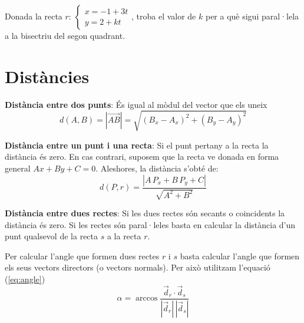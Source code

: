 \begin{mylist}
	\exer Donada la recta $r:\, \left\{ \begin{array}{l}
	x=-1+3t \\
	y=2+kt
	\end{array} \right.$, troba el valor de $k$ per a què sigui paral·lela a la bisectriu del segon quadrant.

\end{mylist}	

	
\pagebreak
\section{Distàncies}
\begin{theorybox}
	\textbf{Distància entre dos punts}: És igual al mòdul del vector que els uneix 
	\begin{equation*}
		d(A,B)=|\overrightarrow{AB}|=\sqrt{(B_x-A_x)^2 + (B_y-A_y)^2}
	\end{equation*}
	
	\textbf{Distància entre un punt i una recta}: Si el punt pertany a la recta la distància és zero. En cas contrari, suposem que la recta ve donada en forma general $Ax+By+C=0$. Aleshores, la distància s'obté de:
	\begin{equation*}
	d(P,r)=\frac{|A\,P_x+B\,P_y+C|}{\sqrt{A^2+B^2}} 
	\end{equation*}
	
\textbf{Distància entre dues rectes}: Si les dues rectes són secants o coincidents la distància és zero. Si les rectes són paral·leles basta en calcular la distància d'un punt qualsevol de la recta $s$ a la recta $r$.
\end{theorybox}

 \begin{theorybox}
 	Per calcular l'angle que formen dues rectes $r$ i $s$ basta calcular l'angle que formen els seus vectors directors (o vectors normals). Per això utilitzam l'equació (\ref{eq:angle})
  \begin{equation*}
 \alpha = \arccos \dfrac{\vec d_r \cdot \vec d_s}{|\vec d_r|\, |\vec d_s|}
 \end{equation*}
 \end{theorybox}

